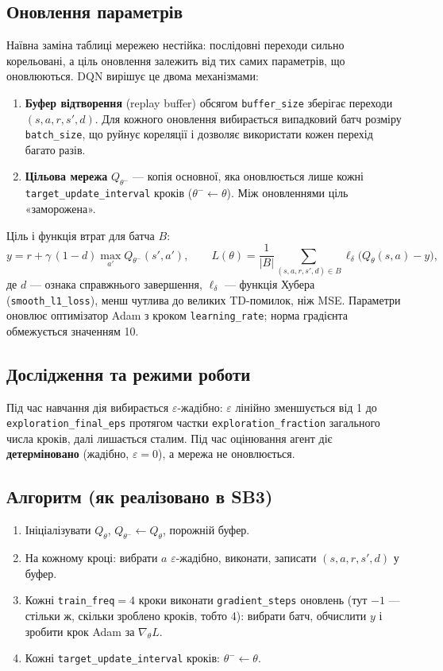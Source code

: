 \documentclass[11pt,a4paper]{article}
\newcommand{\code}[1]{\texttt{#1}}
\begin{document}
\subsection{Оновлення параметрів}
Наївна заміна таблиці мережею нестійка: послідовні переходи сильно корельовані, а ціль оновлення залежить від тих самих параметрів, що оновлюються. DQN вирішує це двома механізмами:
\begin{enumerate}
\item \textbf{Буфер відтворення} (replay buffer) обсягом \code{buffer\_size} зберігає переходи $(s,a,r,s',d)$. Для кожного оновлення вибирається випадковий батч розміру \code{batch\_size}, що руйнує кореляції і дозволяє використати кожен перехід багато разів.
\item \textbf{Цільова мережа} $Q_{\theta^-}$ — копія основної, яка оновлюється лише кожні \code{target\_update\_interval} кроків ($\theta^-\leftarrow\theta$). Між оновленнями ціль «заморожена».
\end{enumerate}
Ціль і функція втрат для батча $B$:
\[
y=r+\gamma\,(1-d)\max_{a'}Q_{\theta^-}(s',a'),\qquad
L(\theta)=\frac{1}{|B|}\sum_{(s,a,r,s',d)\in B}\ell_{\delta}\bigl(Q_\theta(s,a)-y\bigr),
\]
де $d$ — ознака справжнього завершення, $\ell_\delta$ — функція Хубера (\code{smooth\_l1\_loss}), менш чутлива до великих TD-помилок, ніж MSE. Параметри оновлює оптимізатор Adam з кроком \code{learning\_rate}; норма градієнта обмежується значенням 10.

\subsection{Дослідження та режими роботи}
Під час навчання дія вибирається $\varepsilon$-жадібно: $\varepsilon$ лінійно зменшується від 1 до \code{exploration\_final\_eps} протягом частки \code{exploration\_fraction} загального числа кроків, далі лишається сталим. Під час оцінювання агент діє \textbf{детерміновано} (жадібно, $\varepsilon=0$), а мережа не оновлюється.

\subsection{Алгоритм (як реалізовано в SB3)}
\begin{enumerate}[label=\arabic*.]
\item Ініціалізувати $Q_\theta$, $Q_{\theta^-}\leftarrow Q_\theta$, порожній буфер.
\item На кожному кроці: вибрати $a$ $\varepsilon$-жадібно, виконати, записати $(s,a,r,s',d)$ у буфер.
\item Кожні \code{train\_freq}$=4$ кроки виконати \code{gradient\_steps} оновлень (тут $-1$ — стільки ж, скільки зроблено кроків, тобто 4): вибрати батч, обчислити $y$ і зробити крок Adam за $\nabla_\theta L$.
\item Кожні \code{target\_update\_interval} кроків: $\theta^-\leftarrow\theta$.
\end{enumerate}
\end{document}

